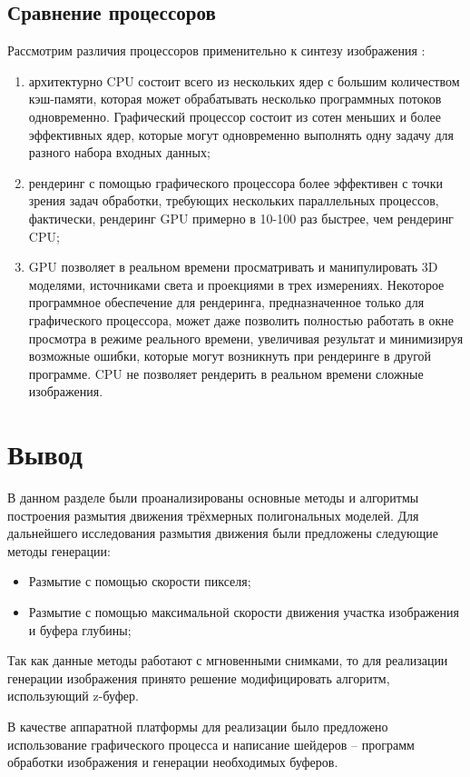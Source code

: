 \subsection{Сравнение процессоров}
Рассмотрим различия процессоров применительно к синтезу изображения \cite{cpu_or_gpu}:
\begin{enumerate}
  \item архитектурно CPU состоит всего из нескольких ядер с большим количеством кэш-памяти, которая может обрабатывать несколько программных потоков одновременно. Графический процессор состоит из сотен меньших и более эффективных ядер, которые могут одновременно выполнять одну задачу для разного набора входных данных;
  \item рендеринг с помощью графического процессора более эффективен с точки зрения задач обработки, требующих нескольких параллельных процессов,
  фактически, рендеринг GPU примерно в 10-100 раз быстрее, чем рендеринг CPU;
  \item GPU позволяет в реальном времени просматривать и манипулировать 3D моделями, источниками света и проекциями в трех измерениях. Некоторое программное обеспечение для рендеринга, предназначенное только для графического процессора, может даже позволить полностью работать в окне просмотра в режиме реального времени, увеличивая результат и минимизируя возможные ошибки, которые могут возникнуть при рендеринге в другой программе. CPU не позволяет рендерить в реальном времени сложные изображения.
\end{enumerate}



\section{Вывод}

В данном разделе были проанализированы основные методы и алгоритмы построения размытия движения трёхмерных полигональных моделей. Для дальнейшего исследования размытия движения были предложены следующие методы генерации:
\begin{itemize}
    \item Размытие с помощью скорости пикселя; 
    \item Размытие с помощью максимальной скорости движения участка изображения и буфера глубины; 
\end{itemize}
\par

Так как данные методы работают с мгновенными снимками, то для реализации генерации изображения принято решение модифицировать алгоритм, использующий z-буфер. 

В качестве аппаратной платформы для реализации было предложено использование графического процесса и написание шейдеров -- программ обработки изображения и генерации необходимых буферов.


